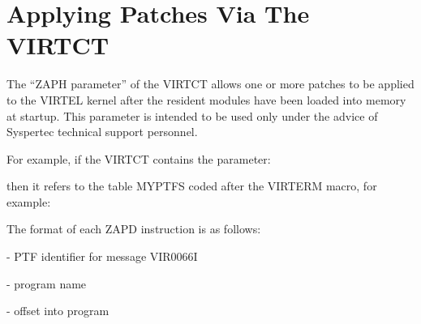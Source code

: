 \documentclass[letterpaper,10pt,english]{sphinxmanual}
\begin{document}
\section{Applying Patches Via The VIRTCT}
\label{\detokenize{Installation_Guide:applying-patches-via-the-virtct}}\label{\detokenize{Installation_Guide:index-150}}
The “ZAPH parameter” of the VIRTCT allows one or more patches to be applied to the VIRTEL kernel after the resident modules have been loaded into memory at startup. This parameter is intended to be used only under the advice of Syspertec technical support personnel.

For example, if the VIRTCT contains the parameter:

\begin{sphinxVerbatim}[commandchars=\\\{\}]
 
\end{sphinxVerbatim}

then it refers to the table MYPTFS coded after the VIRTERM macro, for example:

\begin{sphinxVerbatim}[commandchars=\\\{\}]
   
  
   
\end{sphinxVerbatim}

The format of each ZAPD instruction is as follows:

\begin{sphinxVerbatim}[commandchars=\\\{\}]
  
\end{sphinxVerbatim}

 - PTF identifier for message VIR0066I

 - program name

 - offset into program
\end{document}
